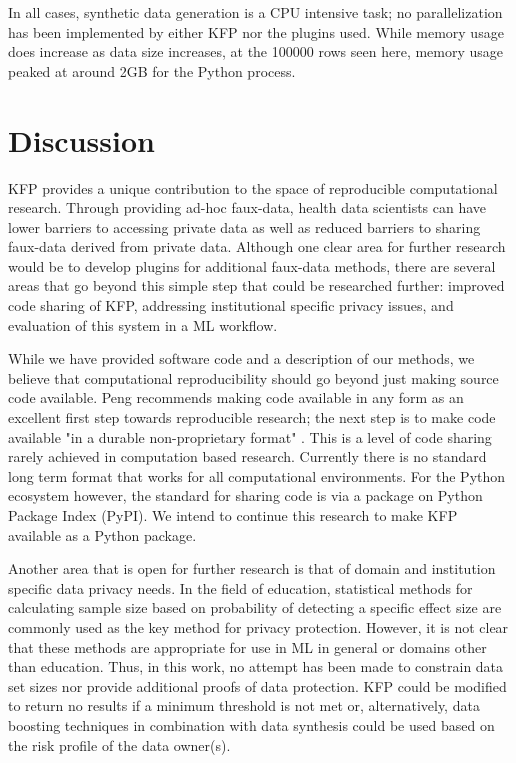 \documentclass{amia}
\begin{document}
In all cases, synthetic data generation is a CPU intensive task; no parallelization has been implemented by either KFP nor the plugins used. While memory usage does increase as data size increases, at the 100000 rows seen here, memory usage peaked at around 2GB for the Python process.

\section{Discussion}

KFP provides a unique contribution to the space of reproducible computational research. Through providing ad-hoc faux-data, health data scientists can have lower barriers to accessing private data as well as reduced barriers to sharing faux-data derived from private data. Although one clear area for further research would be to develop plugins for additional faux-data methods, there are several areas that go beyond this simple step that could be researched further: improved code sharing of KFP, addressing institutional specific privacy issues, and evaluation of this system in a ML workflow.

While we have provided software code and a description of our methods, we believe that computational reproducibility should go beyond just making source code available. Peng recommends making code available in any form as an excellent first step towards reproducible research; the next step is to make code available "in a durable non-proprietary format" \cite{peng_reproducible_2011}. This is a level of code sharing rarely achieved in computation based research. Currently there is no standard long term format that works for all computational environments. For the Python ecosystem however, the standard for sharing code is via a package on Python Package Index (PyPI). We intend to continue this research to make KFP available as a Python package.

Another area that is open for further research is that of domain and institution specific data privacy needs. In the field of education, statistical methods for calculating sample size based on probability of detecting a specific effect size are commonly used \cite{naep_2009} as the key method for privacy protection. However, it is not clear that these methods are appropriate for use in ML in general or domains other than education. Thus, in this work, no attempt has been made to constrain data set sizes nor provide additional proofs of data protection. KFP could be modified to return no results if a minimum threshold is not met or, alternatively, data boosting techniques in combination with data synthesis could be used based on the risk profile of the data owner(s).
\end{document}
